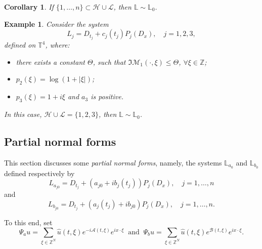 \documentclass[12pt]{elsarticle}
\newtheorem{example}[theorem]{Example}
\newtheorem{corollary}[theorem]{Corollary}
\numberwithin{equation}{section}
\begin{document}
\begin{corollary}\label{coro-gene-psi}
	If $\{1, \ldots, n\} \subset \mathcal{H} \cup \mathcal{L}$, then $\mathbb{L} \sim \mathbb{L}_0$.
\end{corollary}


\begin{example}\label{exe-qui-slog-hor}
	Consider   the system
	$$
L_j = D_{t_j} +  c_j(t_j) P_j(D_x), \quad j=1,2,3,
	$$
	defined on $\mathbb{T}^4$, where:
	\begin{itemize}
		\item there exists a constant $\Theta$, such that $\Im \mathcal{M}_1(\cdot, \xi) \leq \Theta$,  $\forall \xi \in \mathbb{Z}$;
		
		\item $p_2(\xi)= \log(1+ |\xi|)$;
		
		\item $p_3(\xi)= 1 +  i \xi$  and $a_3$ is positive.
		
	\end{itemize}
	
	In this case, 
	$ \mathcal{H} \cup \mathcal{L}= \{1, 2, 3\}$, then $\mathbb{L} \sim \mathbb{L}_0$.
\end{example}





\subsection{Partial  normal forms} 

This section discusses  some \textit{partial  normal forms}, namely, the systems $\mathbb{L}_{a_0}$ and  $\mathbb{L}_{b_0}$ defined respectively by
$$
L_{a_{j0}} = D_{t_j} + (a_{j0} + i b_{j}(t_j))P_j(D_x),  \quad j =1, \ldots, n
$$
and 
$$
L_{b_{j0}} = D_{t_j} + (a_{j}(t_j) + i b_{j0})P_j(D_x), \quad j =1, \ldots, n.
$$


To this end, set 
\begin{equation*}
\Psi_a u =  \sum_{\xi \in \mathbb{Z}^N} \widehat{u}(t, \xi) 
e^{-i \mathcal{A}(t,\xi)} e^{i x \cdot  \xi}
\ \textrm{ and } \
\Psi_b u =  \sum_{\xi \in \mathbb{Z}^N} \widehat{u}(t, \xi) 
e^{\mathcal{B}(t,\xi)} e^{i x \cdot  \xi}.
\end{equation*}
\end{document}
